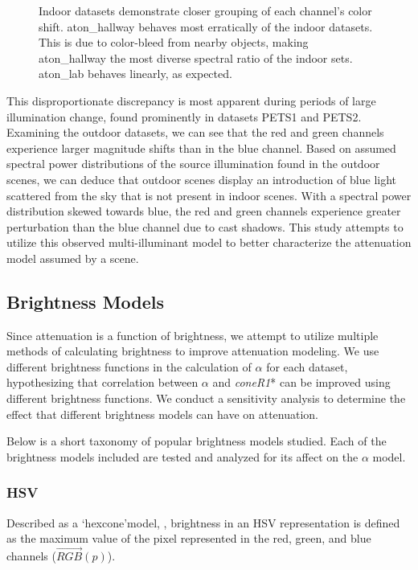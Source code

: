 \begin{figure}
\caption{Indoor datasets demonstrate closer grouping of each channel's color shift. aton\_hallway behaves most erratically of the indoor datasets. This is due to color-bleed from nearby objects, making aton\_hallway the most diverse spectral ratio of the indoor sets. aton\_lab behaves linearly, as expected.}
\label{fig:rgshift_indoor}
\end{figure}

This disproportionate discrepancy is most apparent during periods of large illumination change, found prominently in datasets PETS1 and PETS2. Examining the outdoor datasets, we can see that the red and green channels experience larger magnitude shifts than in the blue channel. Based on assumed spectral power distributions of the source illumination found in the outdoor scenes, we can deduce that outdoor scenes display an introduction of blue light scattered from the sky that is not present in indoor scenes. With a spectral power distribution skewed towards blue, the red and green channels experience greater perturbation than the blue channel due to cast shadows. This study attempts to utilize this observed multi-illuminant model to better characterize the attenuation model assumed by a scene. 

\FloatBarrier
\subsection{Brightness Models} \label{section:brightnessmodels}

Since attenuation is a function of brightness, we attempt to utilize multiple methods of calculating brightness to improve attenuation modeling. We use different brightness functions in the calculation of $\alpha$ for each dataset, hypothesizing that correlation between $\alpha$ and \textit{coneR1}* can be improved using different brightness functions. We conduct a sensitivity analysis to determine the effect that different brightness models can have on attenuation.

Below is a short taxonomy of popular brightness models studied. Each of the brightness models included are tested and analyzed for its affect on the $\alpha$ model.

\subsubsection{HSV}

Described as a \lq{hexcone}\rq model, \cite{smith1978color}, brightness in an HSV representation is defined as the maximum value of the pixel represented in the red, green, and blue channels ($\vec{RGB}(p)$).

